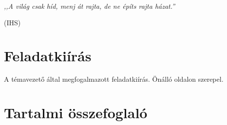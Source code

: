 \documentclass[12pt]{report}
\theoremstyle{definition}
\begin{document}
    \onehalfspacing



    \clearpage
    \thispagestyle{empty}
    {
    \setlength\epigraphrule{0pt}
    \linespread{1.0}\epigraph{\small\emph{,,A világ csak híd, menj át rajta,
    de ne építs rajta házat.''}}{\small(IHS)}
    }



    \tableofcontents




    \chapter*{Feladatkiírás}

A témavezető által megfogalmazott feladatkiírás. Önálló oldalon szerepel.



    \chapter*{Tartalmi összefoglaló}

\end{document}
